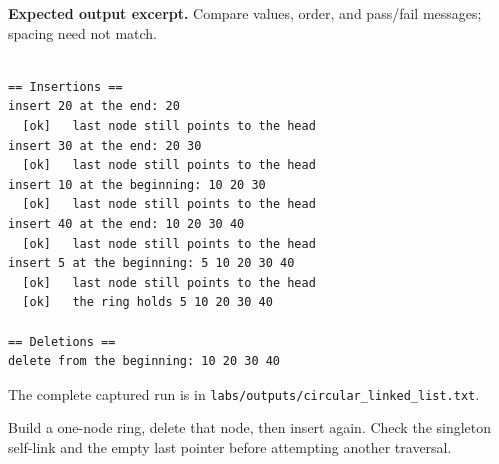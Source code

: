 \textbf{Expected output excerpt.} Compare values, order, and pass/fail messages; spacing need not match.

\begin{lstlisting}[style=utpterminal,language={}]

== Insertions ==
insert 20 at the end: 20 
  [ok]   last node still points to the head
insert 30 at the end: 20 30 
  [ok]   last node still points to the head
insert 10 at the beginning: 10 20 30 
  [ok]   last node still points to the head
insert 40 at the end: 10 20 30 40 
  [ok]   last node still points to the head
insert 5 at the beginning: 5 10 20 30 40 
  [ok]   last node still points to the head
  [ok]   the ring holds 5 10 20 30 40

== Deletions ==
delete from the beginning: 10 20 30 40

\end{lstlisting}

The complete captured run is in \texttt{labs/outputs/circular\_linked\_list.txt}.

\begin{tryit}

Build a one-node ring, delete that node, then insert again. Check the singleton self-link and the empty last pointer before attempting another traversal.

\end{tryit}

